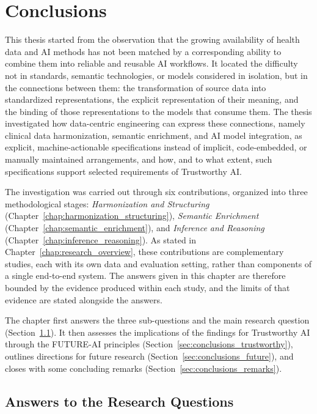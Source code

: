 \chapter{Conclusions}
\label{chap:conclusions}

This thesis started from the observation that the growing availability of health data and AI methods has not been matched by a corresponding ability to combine them into reliable and reusable AI workflows. It located the difficulty not in standards, semantic technologies, or models considered in isolation, but in the connections between them: the transformation of source data into standardized representations, the explicit representation of their meaning, and the binding of those representations to the models that consume them. The thesis investigated how data-centric engineering can express these connections, namely clinical data harmonization, semantic enrichment, and AI model integration, as explicit, machine-actionable specifications instead of implicit, code-embedded, or manually maintained arrangements, and how, and to what extent, such specifications support selected requirements of Trustworthy AI.

The investigation was carried out through six contributions, organized into three methodological stages: \emph{Harmonization and Structuring} (Chapter~\ref{chap:harmonization_structuring}), \emph{Semantic Enrichment} (Chapter~\ref{chap:semantic_enrichment}), and \emph{Inference and Reasoning} (Chapter~\ref{chap:inference_reasoning}). As stated in Chapter~\ref{chap:research_overview}, these contributions are complementary studies, each with its own data and evaluation setting, rather than components of a single end-to-end system. The answers given in this chapter are therefore bounded by the evidence produced within each study, and the limits of that evidence are stated alongside the answers.

The chapter first answers the three sub-questions and the main research question (Section~\ref{sec:conclusions_rq}). It then assesses the implications of the findings for Trustworthy AI through the FUTURE-AI principles (Section~\ref{sec:conclusions_trustworthy}), outlines directions for future research (Section~\ref{sec:conclusions_future}), and closes with some concluding remarks (Section~\ref{sec:conclusions_remarks}).

\section{Answers to the Research Questions}
\label{sec:conclusions_rq}

